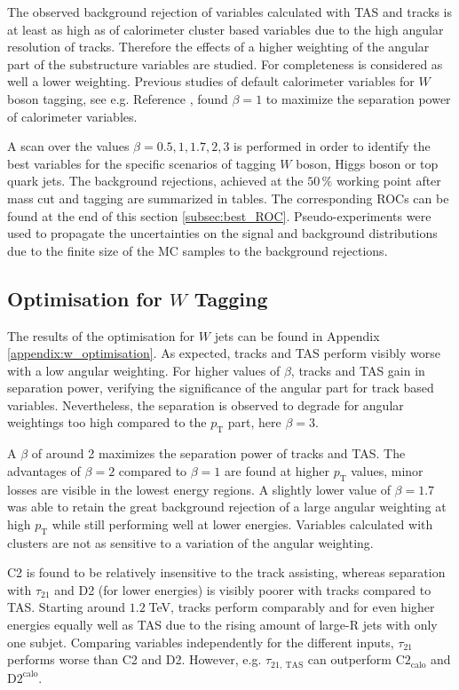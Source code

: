 The observed background rejection of variables calculated with TAS and tracks is at least as high as of calorimeter cluster based variables due to the high angular resolution of tracks. Therefore the effects of a higher weighting of the angular part of the substructure variables are studied.  For completeness is considered as well a lower weighting. Previous studies of default calorimeter variables for $W$ boson tagging, see e.g. Reference \cite{bib:w_tagging}, found $\beta=1$ to maximize the separation power of calorimeter variables.

A scan over the values $\beta= 0.5, 1, 1.7, 2, 3$ is performed in order to identify the best variables for the specific scenarios of tagging $W$ boson, Higgs boson or top quark jets. The background rejections, achieved at the $50\,\%$ working point after mass cut and tagging are summarized in tables. The corresponding ROCs can be found at the end of this section \ref{subsec:best_ROC}. Pseudo-experiments were used to propagate the uncertainties on the signal and background distributions due to the finite size of the MC samples to the background rejections. 

\subsection{Optimisation for $W$ Tagging}\label{sec:wopt}
The results of the optimisation for $W$ jets can be found in Appendix \ref{appendix:w_optimisation}. As expected, tracks and TAS perform visibly worse with a low angular weighting. For higher values of $\beta$, tracks and TAS gain in separation power, verifying the significance of the angular part for track based variables. Nevertheless, the separation is observed to degrade for angular weightings too high compared to the $p_{\mathrm{T}}$ part, here $\beta=3$.

A $\beta$ of around 2 maximizes the separation power of tracks and TAS. The advantages of $\beta=2$ compared to $\beta=1$ are found at higher $p_{\mathrm{T}}$ values, minor losses are visible in the lowest energy regions. A slightly lower value of $\beta=1.7$ was able to retain the great background rejection of a large angular weighting at high $p_{\mathrm{T}}$ while still performing well at lower energies. Variables calculated with clusters are not as sensitive to a variation of the angular weighting.

C2 is found to be relatively insensitive to the track assisting, whereas separation with $\tau_{21}$ and D2 (for lower energies) is visibly poorer with tracks compared to TAS.  Starting around $1.2\;$TeV, tracks perform comparably and for even higher energies equally well as TAS due to the rising amount of large-R jets with only one subjet. Comparing variables independently for the different inputs, $\tau_{21}$ performs worse than C2 and D2. However, e.g. $\tau_{21,\: \text{TAS}}$ can outperform $\text{C2}_{\text{calo}}$ and $\text{D2}^{\text{calo}}$.

